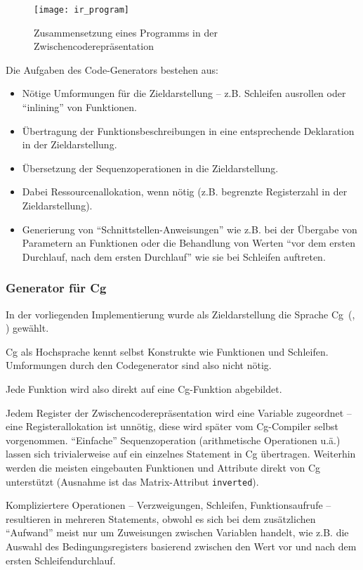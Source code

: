 \documentclass[twoside,a4paper,fleqn,12pt]{article}
\begin{document}
\begin{figure}[h]
   \centering
  \texttt{[image: ir\_program]}
  \caption{Zusammensetzung eines Programms in der Zwischencoderepräsentation}
  \label{fig:ir_program}
\end{figure}

Die Aufgaben des Code-Generators bestehen aus:
\begin{itemize}
\item Nötige Umformungen für die Zieldarstellung -- z.B. Schleifen ausrollen oder ``inlining'' von Funktionen.
\item Übertragung der Funktionsbeschreibungen in eine entsprechende Deklaration in der Zieldarstellung.
\item Übersetzung der Sequenzoperationen in die Zieldarstellung. 
\item Dabei Ressourcenallokation, wenn nötig (z.B. begrenzte Registerzahl in der Zieldarstellung).
\item Generierung von "`Schnittstellen-Anweisungen"' wie z.B. bei der Übergabe von Parametern an Funktionen
oder die Behandlung von Werten "`vor dem ersten Durchlauf, nach dem ersten Durchlauf"' wie sie bei Schleifen
auftreten.
\end{itemize}

\subsubsection{Generator für Cg}

In der vorliegenden Implementierung wurde als Zieldarstellung die Sprache Cg~(\cite{cgpaper}, \cite{cg_home}) gewählt.

Cg als Hochsprache kennt selbst Konstrukte wie Funktionen und Schleifen. Umformungen durch den Codegenerator
sind also nicht nötig.

Jede Funktion wird also direkt auf eine Cg-Funktion abgebildet.

Jedem Register der Zwischencoderepräsentation wird eine Variable zugeordnet -- eine Re\-gis\-ter\-al\-lo\-ka\-tion ist unnötig, diese wird später vom Cg-Compiler selbst vorgenommen.
"`Einfache"' Sequenzoperation (arithmetische Operationen u.ä.) lassen sich trivialerweise auf ein einzelnes Statement in Cg übertragen. 
Weiterhin werden die meisten eingebauten Funktionen und Attribute direkt von Cg unterstützt (Ausnahme ist das Matrix-Attribut \texttt{inverted}).

Kompliziertere Operationen -- Verzweigungen, Schleifen, Funktionsaufrufe -- resultieren in mehreren Statements, obwohl es sich bei dem
zusätzlichen "`Aufwand"' meist nur um Zuweisungen zwischen Variablen handelt, wie z.B. die Auswahl des Bedingungsregisters basierend zwischen
den Wert vor und nach dem ersten Schleifendurchlauf.
\end{document}
